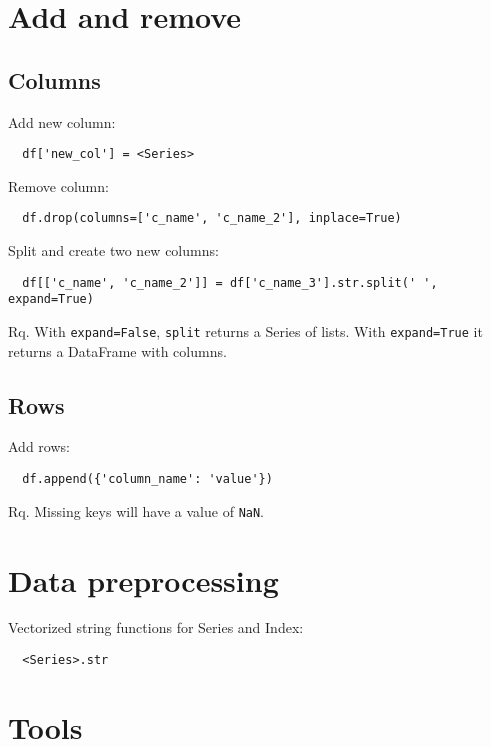 \documentclass[french]{article}
\begin{document}
\section{Add and remove}

\subsection{Columns}

Add new column:
\begin{verbatim}
  df['new_col'] = <Series>
\end{verbatim}

Remove column:
\begin{verbatim}
  df.drop(columns=['c_name', 'c_name_2'], inplace=True)
\end{verbatim}

Split and create two new columns:
\begin{verbatim}
  df[['c_name', 'c_name_2']] = df['c_name_3'].str.split(' ', expand=True)
\end{verbatim}
Rq. With \verb|expand=False|, \verb|split| returns a Series of lists. With \verb|expand=True| it returns a DataFrame with columns.

\subsection{Rows}

Add rows:
\begin{verbatim}
  df.append({'column_name': 'value'})
\end{verbatim}
Rq. Missing keys will have a value of \verb|NaN|.


\section{Data preprocessing}

Vectorized string functions for Series and Index:
\begin{verbatim}
  <Series>.str
\end{verbatim}

\section{Tools}
\end{document}
